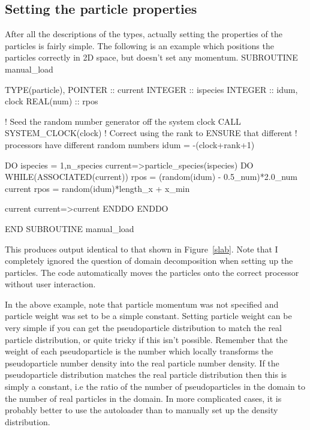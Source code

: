 \documentclass[12pt,a4paper]{article}
\newenvironment{boxverbatim}{\lboxverbatim{none}}{\endlboxverbatim}
\begin{document}
\subsection{Setting the particle properties}
After all the descriptions of the types, actually setting the properties of
the particles is fairly simple. The following is an example which positions
the particles correctly in 2D space, but doesn't set any momentum.
\begin{boxverbatim}
SUBROUTINE manual_load

  TYPE(particle), POINTER :: current
  INTEGER :: ispecies
  INTEGER :: idum, clock
  REAL(num) :: rpos

  ! Seed the random number generator off the system clock
  CALL SYSTEM_CLOCK(clock)
  ! Correct using the rank to ENSURE that different
  ! processors have different random numbers
  idum = -(clock+rank+1)

  DO ispecies = 1,n_species
    current=>particle_species(ispecies)%
    DO WHILE(ASSOCIATED(current))
      rpos = (random(idum) - 0.5_num)*2.0_num
      current%
      rpos = random(idum)*length_x + x_min

      current%
      current=>current%
    ENDDO
  ENDDO

END SUBROUTINE manual_load
\end{boxverbatim}

This produces output identical to that shown in Figure~\ref{slab}. Note that
I completely ignored the question of domain decomposition when setting up the
particles. The code automatically moves the particles onto the correct
processor without user interaction.

In the above example, note that particle momentum was not specified and
particle weight was set to be a simple constant. Setting particle weight can
be very simple if you can get the pseudoparticle distribution to match the
real particle distribution, or quite tricky if this isn't possible. Remember
that the weight of each pseudoparticle is the number which locally transforms
the pseudoparticle number density into the real particle number density. If
the pseudoparticle distribution matches the real particle distribution then
this is simply a constant, i.e the ratio of the number of pseudoparticles in
the domain to the number of real particles in the domain. In more complicated
cases, it is probably better to use the autoloader than to manually set up the
density distribution.
\end{document}
